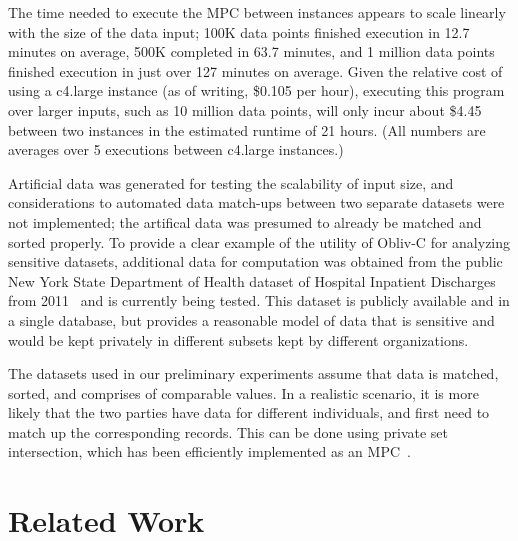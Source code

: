 \documentclass[conference]{IEEEtran}
\begin{document}
The time needed to execute the MPC between instances appears to scale
linearly with the size of the data input; 100K data points finished
execution in 12.7 minutes on average, 500K completed in 63.7 minutes,
and 1 million data points finished execution in just over 127 minutes on
average. Given the relative cost of using a c4.large instance (as of
writing, \$0.105 per hour), executing this program over larger inputs,
such as 10 million data points, will only incur about \$4.45 between two
instances in the estimated runtime of 21 hours.  (All numbers are
averages over 5 executions between c4.large instances.)

Artificial data was generated for testing the scalability of input size,
and considerations to automated data match-ups between two separate
datasets were not implemented; the artifical data was presumed to
already be matched and sorted properly.  To provide a clear example of
the utility of Obliv-C for analyzing sensitive datasets, additional data
for computation was obtained from the public New York State Department
of Health dataset of Hospital Inpatient Discharges from
2011~\cite{healthdata:ny} and is currently being tested. 
This dataset is publicly available and in a
single database, but provides a reasonable model of data that is
sensitive and would be kept privately in different subsets kept by
different organizations.


The datasets used in our preliminary experiments assume that data is
matched, sorted, and comprises of comparable values. In a realistic
scenario, it is more likely that the two parties have data for different
individuals, and first need to match up the corresponding records.  This
can be done using private set intersection, which has been efficiently
implemented as an MPC~\cite{NDSS:HuaEvaKat12}.

\section{Related Work}
\end{document}
